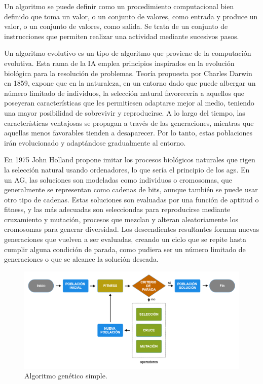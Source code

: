 Un algoritmo se puede definir como un procedimiento computacional bien definido que toma un valor, o un conjunto de valores, como entrada y produce un valor, o un conjunto de valores, como salida. Se trata de un conjunto de instrucciones que permiten realizar una actividad mediante sucesivos pasos.

Un algoritmo evolutivo es un tipo de algoritmo que proviene de la computación evolutiva. Esta rama de la IA emplea principios inspirados en la evolución biológica para la resolución de problemas. Teoría propuesta por Charles Darwin en 1859, expone que en la naturaleza, en un entorno dado que puede albergar un número limitado de individuos, la selección natural favorecería a aquellos que poseyeran características que les permitiesen adaptarse mejor al medio, teniendo una mayor posibilidad de sobrevivir y reproducirse. A lo largo del tiempo, las características ventajosas se propagan a través de las generaciones, mientras que aquellas menos favorables tienden a desaparecer. Por lo tanto, estas poblaciones irán evolucionado y adaptándose gradualmente al entorno.

En 1975 John Holland propone imitar los procesos biológicos naturales que rigen la selección natural usando ordenadores, lo que sería el principio de los \glspl{ag}. En un AG, las soluciones son modeladas como individuos o cromosomas, que generalmente se representan como cadenas de bits, aunque también se puede usar otro tipo de cadenas. Estas soluciones son evaluadas por una función de aptitud o fitness, y las más adecuadas son selecciondas para reproducirse mediante cruzamiento y mutación, procesos que mezclan y alteran aleatoriamente los cromosomas para generar diversidad. Los descendientes resultantes forman nuevas generaciones que vuelven a ser evaluadas, creando un ciclo que se repite hasta cumplir alguna condición de parada, como pudiera ser un número limitado de generaciones o que se alcance la solución deseada.

\begin{figure}[H]
    \centering
    \includegraphics[width=1\textwidth]{figures/algoritmo-genetico.png}
    \caption{Algoritmo genético simple.}
    \label{fig:algoritmo-genetico}
  \end{figure}

